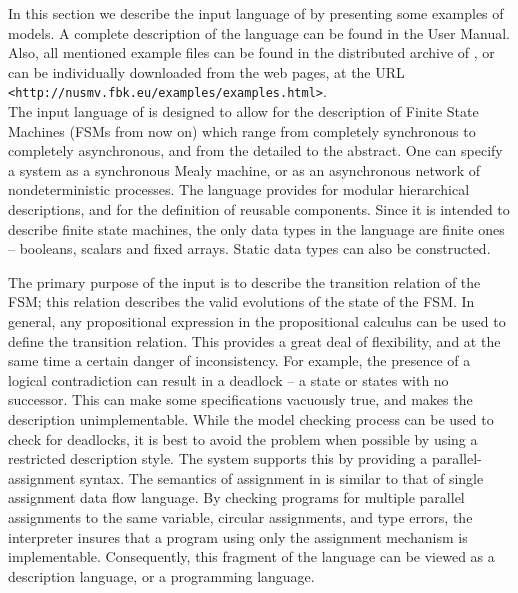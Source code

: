 In this section we describe the input language of \nusmv by
presenting some examples of \nusmv models. A complete description
of the \nusmv language can be found in the \NuSMV User Manual.
Also, all mentioned example files can be found in the distributed
archive of \NuSMV, or can be individually downloaded from the \nusmv
web pages, at the URL 
\texttt{<http://nusmv.fbk.eu/examples/examples.html>}.
\\

The input language of \nusmv is designed to allow for the
description of Finite State Machines (FSMs from now on) which range from
completely synchronous to completely asynchronous, and from the detailed
to the abstract.
One can specify a system as a synchronous Mealy machine, or as
an asynchronous network of nondeterministic processes. The language
provides for modular hierarchical descriptions, and for the definition
of reusable components. Since it is intended to describe finite state
machines, the only data types in the language are finite ones --
booleans, scalars and fixed arrays. Static data types can also be
constructed.

The primary purpose of the \nusmv input is to describe the
transition relation of the FSM; this relation describes the valid
evolutions of the state of the FSM.
In general, any propositional expression in the propositional calculus
can be used to define the transition relation. This
provides a great deal of flexibility, and at the same time a certain
danger of inconsistency. For example, the presence of a logical
contradiction can result in a deadlock -- a state or states with no
successor. This can make some specifications vacuously true, and makes
the description unimplementable.  While the model checking process can
be used to check for deadlocks, it is best to avoid the problem when
possible by using a restricted description style. The \nusmv system
supports this by providing a parallel-assignment syntax. The semantics
of assignment in \nusmv is similar to that of single assignment data
flow language. By checking programs for multiple parallel assignments to
the same variable, circular assignments, and type errors, the
interpreter insures that a program using only the assignment mechanism
is implementable. Consequently, this fragment of the language can be
viewed as a description language, or a programming language.

